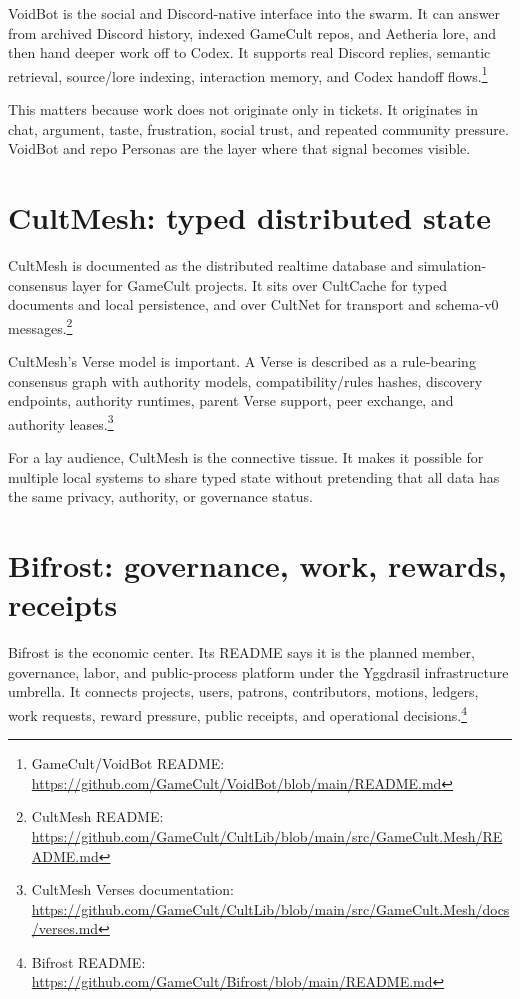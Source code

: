 \documentclass[11pt,oneside]{report}
\newcommand{\src}[2]{\footnote{#1: \url{#2}}}
\begin{document}
VoidBot is the social and Discord-native interface into the swarm. It can answer from archived Discord history, indexed GameCult repos, and Aetheria lore, and then hand deeper work off to Codex. It supports real Discord replies, semantic retrieval, source/lore indexing, interaction memory, and Codex handoff flows.\src{GameCult/VoidBot README}{https://github.com/GameCult/VoidBot/blob/main/README.md}

This matters because work does not originate only in tickets. It originates in chat, argument, taste, frustration, social trust, and repeated community pressure. VoidBot and repo Personas are the layer where that signal becomes visible.

\section{CultMesh: typed distributed state}

CultMesh is documented as the distributed realtime database and simulation-consensus layer for GameCult projects. It sits over CultCache for typed documents and local persistence, and over CultNet for transport and schema-v0 messages.\src{CultMesh README}{https://github.com/GameCult/CultLib/blob/main/src/GameCult.Mesh/README.md}

CultMesh's Verse model is important. A Verse is described as a rule-bearing consensus graph with authority models, compatibility/rules hashes, discovery endpoints, authority runtimes, parent Verse support, peer exchange, and authority leases.\src{CultMesh Verses documentation}{https://github.com/GameCult/CultLib/blob/main/src/GameCult.Mesh/docs/verses.md}

For a lay audience, CultMesh is the connective tissue. It makes it possible for multiple local systems to share typed state without pretending that all data has the same privacy, authority, or governance status.

\section{Bifrost: governance, work, rewards, receipts}

Bifrost is the economic center. Its README says it is the planned member, governance, labor, and public-process platform under the Yggdrasil infrastructure umbrella. It connects projects, users, patrons, contributors, motions, ledgers, work requests, reward pressure, public receipts, and operational decisions.\src{Bifrost README}{https://github.com/GameCult/Bifrost/blob/main/README.md}
\end{document}
